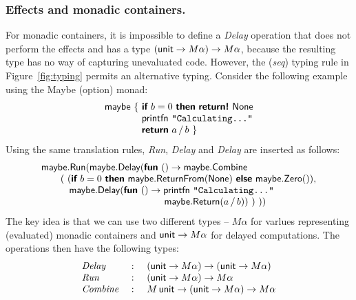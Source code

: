 \documentclass[runningheads,a4paper]{llncs}
\begin{document}
\subsubsection{Effects and monadic containers.} For monadic containers, it is impossible to define
a \emph{Delay} operation that does not perform the effects and has a type $(\textnormal{\sffamily unit} \rightarrow M\alpha) \rightarrow M\alpha$,
because the resulting type has no way of capturing unevaluated code. However, the (\emph{seq}) typing 
rule in Figure~\ref{fig:typing} permits an alternative typing. Consider the following example using 
the Maybe (option) monad:
%
\begin{equation*}
\begin{array}{l}
\ident{maybe}~\{~\kvd{if}~b=0~\kvd{then}~\kvd{return!}~\ident{None}\\
\hspace{3.85em}  \ident{printfn}~\texttt{"Calculating..."}\\
\hspace{3.85em}  \kvd{return}~a\,/\,b~\}\\
\end{array}
\end{equation*}
%
Using the same translation rules, \emph{Run}, \emph{Delay} and \emph{Delay} are inserted as follows:
%
\begin{equation*}
\begin{array}{l}
\ident{maybe}.\ident{Run}(\ident{maybe}.\ident{Delay}(\kvd{fun}~()\rightarrow \ident{maybe}.\ident{Combine}\\
\quad\quad (~(\kvd{if}~b=0~\kvd{then}~\ident{maybe}.\ident{ReturnFrom}(\ident{None})~
    \kvd{else}~\ident{maybe}.\ident{Zero}()), \\
\hspace{2.9em} \ident{maybe}.\ident{Delay}(\kvd{fun}~()\rightarrow \ident{printfn}~\texttt{"Calculating..."}\\
\hspace{12.8em}     \ident{maybe}.\ident{Return}(a\,/\,b))~)~))
\end{array}
\end{equation*}
%
The key idea is that we can use two different types -- $M\alpha$ for varlues representing
(evaluated) monadic containers and $\textnormal{\sffamily unit} \rightarrow M\alpha$ for delayed computations. The 
operations then have the following types:
%
\begin{equation*}
\begin{array}{lcl}
\emph{Delay}   &~:~& (\textnormal{\sffamily unit} \rightarrow M\alpha) \rightarrow (\textnormal{\sffamily unit} \rightarrow M\alpha)\\
\emph{Run}     &~:~& (\textnormal{\sffamily unit} \rightarrow M\alpha) \rightarrow M\alpha\\
\emph{Combine} &~:~& M\,\textnormal{\sffamily unit} \rightarrow (\textnormal{\sffamily unit} \rightarrow M\alpha) \rightarrow M\alpha
\end{array}
\end{equation*}
\end{document}
